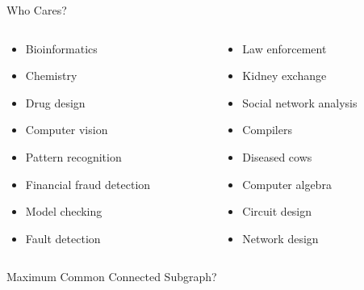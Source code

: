 \documentclass{beamer}
\begin{document}
\begin{frame}{Who Cares?}
    \begin{columns}
        \begin{column}{0.45\textwidth}
            \begin{itemize}
                \item Bioinformatics
                \item Chemistry
                \item Drug design
                \item Computer vision
                \item Pattern recognition
                \item Financial fraud detection
                \item Model checking
                \item Fault detection
            \end{itemize}
        \end{column}
        \begin{column}{0.45\textwidth}
            \begin{itemize}
                \item Law enforcement
                \item Kidney exchange
                \item Social network analysis
                \item Compilers
                \item Diseased cows
                \item Computer algebra
                \item Circuit design
                \item Network design
            \end{itemize}
        \end{column}
    \end{columns}
\end{frame}

\begin{frame}{Maximum Common Connected Subgraph?}

    \begin{columns}
        \begin{column}{0.45\textwidth}
            \centering
        \end{column}
        \begin{column}{0.45\textwidth}
            \centering
        \end{column}
    \end{columns}

\end{frame}
\end{document}
